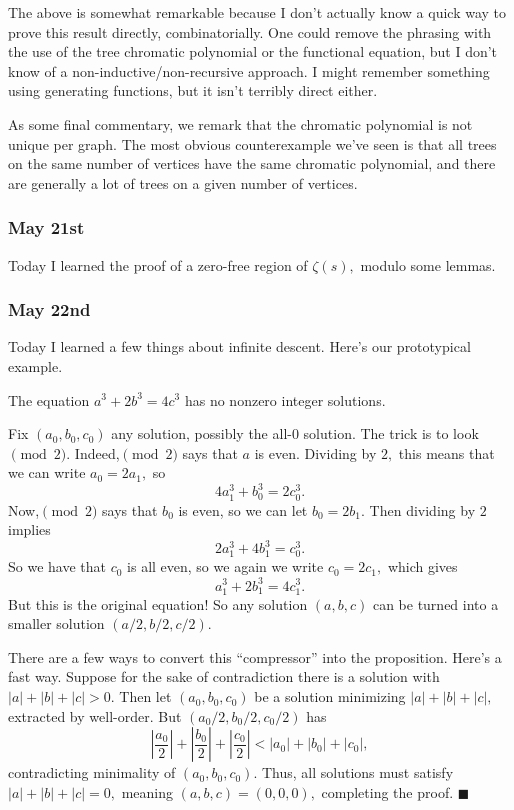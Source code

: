 The above is somewhat remarkable because I don't actually know a quick way to prove this result directly, combinatorially. One could remove the phrasing with the use of the tree chromatic polynomial or the functional equation, but I don't know of a non-inductive/non-recursive approach. I might remember something using generating functions, but it isn't terribly direct either.

As some final commentary, we remark that the chromatic polynomial is not unique per graph. The most obvious counterexample we've seen is that all trees on the same number of vertices have the same chromatic polynomial, and there are generally a lot of trees on a given number of vertices.

\subsubsection{May 21st}
Today I learned the proof of a zero-free region of $\zeta(s),$ modulo some lemmas.\todo{}

\subsubsection{May 22nd}
Today I learned a few things about infinite descent. Here's our prototypical example.
\begin{proposition}
    The equation $a^3+2b^3=4c^3$ has no nonzero integer solutions.
\end{proposition}
Fix $(a_0,b_0,c_0)$ any solution, possibly the all-$0$ solution. The trick is to look$\pmod2.$ Indeed,$\pmod2$ says that $a$ is even. Dividing by $2,$ this means that we can write $a_0=2a_1,$ so
\[4a_1^3+b_0^3=2c_0^3.\]
Now,$\pmod2$ says that $b_0$ is even, so we can let $b_0=2b_1.$ Then dividing by $2$ implies
\[2a_1^3+4b_1^3=c_0^3.\]
So we have that $c_0$ is all even, so we again we write $c_0=2c_1,$ which gives
\[a_1^3+2b_1^3=4c_1^3.\]
But this is the original equation! So any solution $(a,b,c)$ can be turned into a smaller solution $(a/2,b/2,c/2).$

There are a few ways to convert this ``compressor'' into the proposition. Here's a fast way. Suppose for the sake of contradiction there is a solution with $|a|+|b|+|c|>0.$ Then let $(a_0,b_0,c_0)$ be a solution minimizing $|a|+|b|+|c|,$ extracted by well-order. But $(a_0/2,b_0/2,c_0/2)$ has
\[\left|\frac{a_0}2\right|+\left|\frac{b_0}2\right|+\left|\frac{c_0}2\right|<|a_0|+|b_0|+|c_0|,\]
contradicting minimality of $(a_0,b_0,c_0).$ Thus, all solutions must satisfy $|a|+|b|+|c|=0,$ meaning $(a,b,c)=(0,0,0),$ completing the proof. $\blacksquare$


